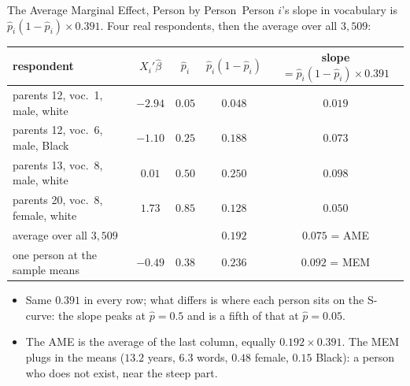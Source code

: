 \documentclass[aspectratio=169,11pt,xcolor=dvipsnames]{beamer}
\newcommand{\core}{\,\raisebox{0.6pt}{\textcolor{corestar}{$\bigstar$}}}
\begin{document}
\begin{frame}{The Average Marginal Effect, Person by Person\core}
Person $i$'s slope in vocabulary is $\hat p_i(1-\hat p_i)\times 0.391$.
Four real respondents, then the average over all $3{,}509$:
\begin{center}\footnotesize
\renewcommand{\arraystretch}{1.0}
\begin{tabular}{lcccc}
\toprule
respondent & $X_i'\hat\beta$ & $\hat p_i$ & $\hat p_i(1-\hat p_i)$ & slope $= \hat p_i(1-\hat p_i)\times 0.391$ \\
\midrule
parents 12, voc.\ 1, male, white & $-2.94$ & $0.05$ & $0.048$ & $0.019$ \\
parents 12, voc.\ 6, male, Black & $-1.10$ & $0.25$ & $0.188$ & $0.073$ \\
parents 13, voc.\ 8, male, white & $0.01$ & $0.50$ & $0.250$ & $0.098$ \\
parents 20, voc.\ 8, female, white & $1.73$ & $0.85$ & $0.128$ & $0.050$ \\
\midrule
average over all $3{,}509$ & & & $0.192$ & $\mathbf{0.075}$ = AME \\
one person at the sample means & $-0.49$ & $0.38$ & $0.236$ & $0.092$ = MEM \\
\bottomrule
\end{tabular}
\end{center}
\begin{itemize}\itemsep1pt
  \item Same $0.391$ in every row; what differs is where each person sits
        on the S-curve: the slope peaks at $\hat p = 0.5$ and is a fifth
        of that at $\hat p = 0.05$.
  \item The AME is the average of the last column, equally $0.192 \times
        0.391$. The MEM plugs in the means ($13.2$ years, $6.3$ words,
        $0.48$ female, $0.15$ Black): a person who does not exist, near
        the steep part.
\end{itemize}
\end{frame}
\end{document}
